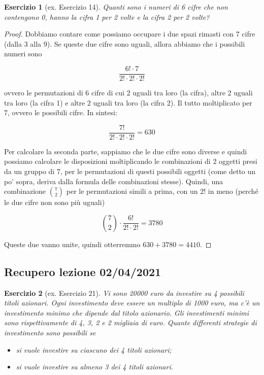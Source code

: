 \documentclass[12pt]{article}
\newtheorem{theorem}{Esercizio}
\begin{document}
\begin{theorem}[ex. Esercizio 14]
	Quanti sono i numeri di 6 cifre che non contengono 0, hanno la cifra 1 per 2 volte e la cifra 2 per 2 volte?
\end{theorem}

\begin{proof}
	Dobbiamo contare come possiamo occupare i due spazi rimasti con 7 cifre (dalla 3 alla 9). Se queste due cifre sono uguali, allora abbiamo che i possibili numeri sono
	
	\[
		\frac{6! \cdot 7}{2! \cdot 2! \cdot 2!}
	\]
	
	ovvero le permutazioni di 6 cifre di cui 2 uguali tra loro (la cifra), altre 2 uguali tra loro (la cifra 1) e altre 2 uguali tra loro (la cifra 2). Il tutto moltiplicato per 7, ovvero le possibili cifre. In sintesi:
	
	\[
		\frac{7!}{2! \cdot 2! \cdot 2!} = 630
	\]
	
	Per calcolare la seconda parte, sappiamo che le due cifre sono diverse e quindi possiamo calcolare le disposizioni moltiplicando le combinazioni di 2 oggetti presi da un gruppo di 7, per le permutazioni di questi possibili oggetti (come detto un po' sopra, deriva dalla formula delle combinazioni stesse). Quindi, una combinazione $\binom{7}{2}$ per le permutazioni simili a prima, con un 2! in meno (perché le due cifre non sono più uguali)
	
	\[
		\binom{7}{2} \cdot \frac{6!}{2! \cdot 2!} = 3780
	\]
	
	Queste due vanno unite, quindi otterremmo $630 + 3780 = 4410$.
\end{proof}


\subsection{Recupero lezione 02/04/2021}

\begin{theorem}[ex. Esercizio 21]
	Vi sono 20000 euro da investire su 4 possibili titoli azionari. Ogni investimento deve essere un multiplo di 1000 euro, ma c’è un investimento minimo che dipende dal titolo azionario. Gli investimenti minimi sono rispettivamente di 4, 3, 2 e 2 migliaia di euro. Quante differenti strategie di investimento sono possibili se
	\begin{itemize}
		\item si vuole investire su ciascuno dei 4 titoli azionari;
		\item si vuole investire su almeno 3 dei 4 titoli azionari.
	\end{itemize}
\end{theorem}
\end{document}
